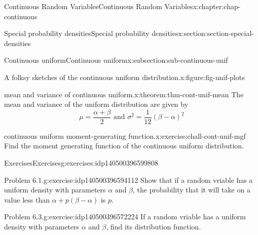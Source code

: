 \documentclass[oneside,10pt,]{book}
\begin{document}
\begin{chapterptx}{Continuous Random Variables}{}{Continuous Random Variables}{}{}{x:chapter:chap-continuous}
\begin{sectionptx}{Special probability densities}{}{Special probability densities}{}{}{x:section:section-special-densities}
\begin{subsectionptx}{Continuous uniform}{}{Continuous uniform}{}{}{x:subsection:sub-continuous-unif}
\begin{figureptx}{A folksy sketches of the continuous uniform distribution.}{x:figure:fig-unif-plots}{}
\tcblower
\end{figureptx}%
\begin{theorem}{mean and variance of continuous uniform.}{}{x:theorem:thm-cont-unif-mean}%
The mean and variance of the uniform distribution are given by%
\begin{equation*}
\mu = \dfrac{\alpha + \beta}{2}\text{ and }\sigma^2 =
\dfrac{1}{12}(\beta-\alpha)^2
\end{equation*}
%
\end{theorem}
\begin{inlineexercise}{continuous uniform moment-generating function.}{x:exercise:chall-cont-unif-mgf}%
Find the moment generating function of the continuous uniform distribution.%
\end{inlineexercise}
%
%
\typeout{************************************************}
\typeout{************************************************}
%
\begin{exercises-subsubsection}{Exercises}{}{Exercises}{}{}{g:exercises:idp140500396599808}
\begin{divisionexercise}{1}{Problem 6.1.}{}{g:exercise:idp140500396594112}%
Show that if a random vriable has a uniform density with parameters \(\alpha\) and \(\beta\), the probability that it will take on a value less than \(\alpha + p(\beta - \alpha)\) is \(p\).%
\end{divisionexercise}%
\begin{divisionexercise}{2}{Problem 6.3.}{}{g:exercise:idp140500396572224}%
If a random vriable has a uniform density with parameters \(\alpha\) and \(\beta\), find its distribution function.%
\end{divisionexercise}%
\end{exercises-subsubsection}
\end{subsectionptx}
%
%
\typeout{************************************************}
\typeout{************************************************}
%
\end{sectionptx}
\end{chapterptx}
\end{document}
